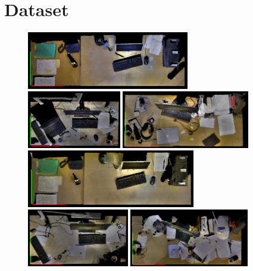 \documentclass[letterpaper, 10 pt, conference]{ieeeconf}  %
\begin{document}
\section{Dataset}
\label{sec:Dataset}

\begin{figure}
\begin{center}
\includegraphics[height=2.5cm]{David_Mor_131110} \quad
\includegraphics[height=2.5cm]{Nils_Mor_131111} \quad
\includegraphics[height=2.5cm]{Puren_Eve_131029}\\ \smallskip
\includegraphics[height=2.5cm]{David_Eve_131110} \enskip
\includegraphics[height=2.5cm]{Nils_Eve_131111} \enskip
\includegraphics[height=2.5cm]{Puren_Mor_131110}

\end{center}
\end{figure}
\end{document}
